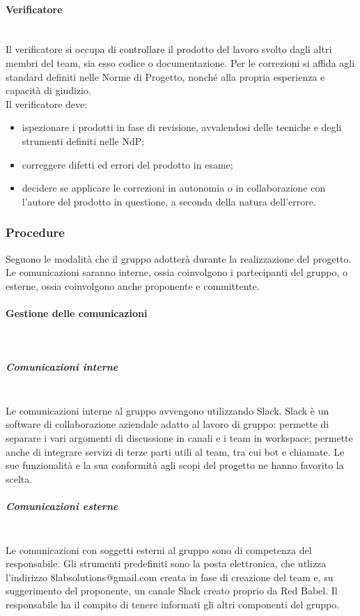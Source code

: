 			\paragraph{Verificatore} \mbox{}\\
			Il verificatore si occupa di controllare il prodotto del lavoro svolto dagli altri membri del team, sia esso codice o documentazione. Per le correzioni si affida agli standard definiti nelle Norme di Progetto, nonché alla propria esperienza e capacità di giudizio.\\
			Il verificatore deve:
			\begin{itemize}
				\item ispezionare i prodotti in fase di revisione, avvalendosi delle tecniche e degli strumenti definiti nelle NdP;
				\item correggere difetti ed errori del prodotto in esame;
				\item decidere se applicare le correzioni in autonomia o in collaborazione con l'autore del prodotto in questione, a seconda della natura dell'errore.
			\end{itemize}
		\subsubsection{Procedure}
		Seguono le modalità che il gruppo adotterà durante la realizzazione del progetto. Le comunicazioni saranno interne, ossia coinvolgono i partecipanti del gruppo, o esterne, ossia coinvolgono anche proponente e committente.
			\paragraph{Gestione delle comunicazioni} \mbox{}\\
			\subparagraph{Comunicazioni interne} \mbox{}\\
			Le comunicazioni interne al gruppo avvengono utilizzando Slack. Slack è un software di collaborazione aziendale adatto al lavoro di gruppo: permette di separare i vari argomenti di discussione in canali e i team in workspace; permette anche di integrare servizi di terze parti utili al team, tra cui bot e chiamate. Le sue funzionalità e la sua conformità agli scopi del progetto ne hanno favorito la scelta.
			\subparagraph{Comunicazioni esterne} \mbox{}\\
				Le comunicazioni con soggetti esterni al gruppo sono di competenza del responsabile. Gli strumenti predefiniti sono la posta elettronica, che utlizza l'indirizzo 8labsolutions@gmail.com creata in fase di creazione del team e, su suggerimento del proponente, un canale Slack creato proprio da Red Babel. Il responsabile ha il compito di tenere informati gli altri componenti del gruppo.
